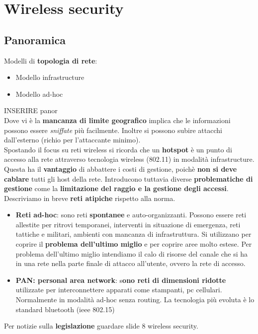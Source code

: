 \documentclass[12pt]{article}
\begin{document}
	\section{Wireless security}
		\subsection{Panoramica}
			Modelli di \textbf{topologia di rete}:
			\begin{itemize}
				\item Modello infrastructure
				\item Modello ad-hoc
			\end{itemize}
		
			INSERIRE panor\\
			
			Dove vi è la \textbf{mancanza di limite geografico} implica che le informazioni possono essere \textit{sniffate} più facilmente. Inoltre si possono subire attacchi dall'esterno (richio per l'attaccante minimo).\\
			Spostando il focus su reti wireless si ricorda che un \textbf{hotspot} è un punto di accesso alla rete attraverso tecnologia wireless (802.11) in modalità infrastructure. Questa ha il \textbf{vantaggio} di abbattere i costi di gestione, poichè \textbf{non si deve cablare} tutti gli host della rete. Introducono tuttavia diverse \textbf{problematiche di gestione} come la \textbf{limitazione del raggio e la gestione degli accessi}.\\
			Descriviamo in breve \textbf{reti atipiche} rispetto alla norma.
			\begin{itemize}
				\item \textbf{Reti ad-hoc}:  sono reti \textbf{spontanee} e auto-organizzanti. Possono essere reti allestite per ritrovi temporanei, interventi in situazione di emergenza, reti tattiche e militari, ambienti con mancanza di infrastruttura. Si utilizzano per coprire il \textbf{problema dell'ultimo miglio} e per coprire aree molto estese. Per problema dell'ultimo miglio intendiamo il calo di risorse del canale che si ha in una rete nella parte finale di attacco all'utente, ovvero la rete di accesso.
				\item \textbf{PAN: personal area network}: s\textbf{ono reti di dimensioni ridotte} utilizzate per interconnettere apparati come stampanti, pc cellulari. Normalmente in modalità ad-hoc senza routing. La tecnologia più evoluta è lo standard bluetooth (ieee 802.15)
			\end{itemize}
			Per notizie sulla \textbf{legislazione} guardare slide 8 wireless security.\\
\end{document}
